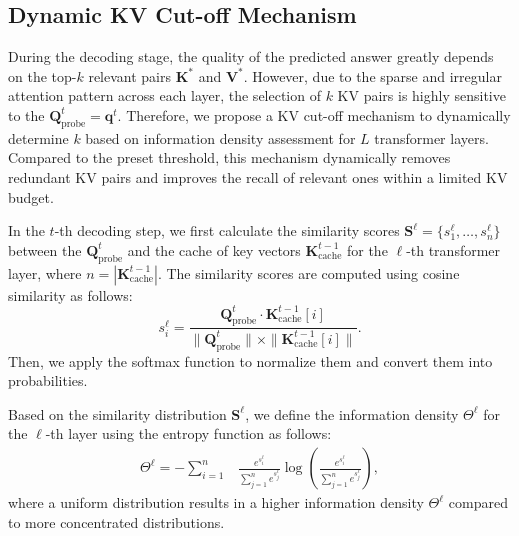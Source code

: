 \subsection{Dynamic KV Cut-off Mechanism}
\label{sec:co}
During the decoding stage, the quality of the predicted answer greatly depends on the top-$k$ relevant pairs $\mathbf{K}^{*}$ and $\mathbf{V}^{*}$. However, due to the sparse and irregular attention pattern across each layer, the selection of $k$ KV pairs is highly sensitive to the \pq $\mathbf{Q}^{t}_{\text{probe}}=\mathbf{q}^{t}$. Therefore, we propose a KV cut-off mechanism to dynamically determine $k$ based on information density assessment for $L$ transformer layers. Compared to the preset threshold, this mechanism dynamically removes redundant KV pairs and improves the recall of relevant ones within a limited KV budget.

In the $t$-th decoding step, we first calculate the similarity scores $\mathbf{S}^\ell = \{s_{1}^\ell, \dots, s_{n}^\ell \}$ between the \pq $\mathbf{Q}^{t}_{\text{probe}}$ and the cache of key vectors $\mathbf{K}^{t-1}_{\text{cache}}$ for the $\ell$-th transformer layer, where $n = |\mathbf{K}^{t-1}_{\text{cache}}|$. The similarity scores are computed using cosine similarity as follows:
\begin{equation}
s_i^\ell = \frac{\mathbf{Q}^{t}_{\text{probe}} \cdot \mathbf{K}^{t-1}_{\text{cache}}[i]}{\|\mathbf{Q}^{t}_{\text{probe}}\| \times \|\mathbf{K}^{t-1}_{\text{cache}}[i]\|}.
\label{eq:cosine_similarity}
\end{equation}
Then, we apply the softmax function to normalize them and convert them into probabilities.


Based on the similarity distribution $\mathbf{S}^\ell$, we define the information density $\Theta^\ell$ for the $\ell$-th layer using the entropy function as follows:
\begin{equation}
\begin{aligned}
\Theta^\ell= - \sum_{i=1}^{n} & \frac{e^{s_i^\ell}}{\sum_{j=1}^{n} e^{s_j^\ell}} \log \left( \frac{e^{s_i^\ell}}{\sum_{j=1}^{n} e^{s_j^\ell}} \right),
\label{eq:entropy}
\end{aligned}
\end{equation}
where a uniform distribution results in a higher information density $\Theta^\ell$ compared to more concentrated distributions.



